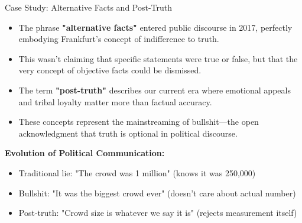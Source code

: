 \documentclass{beamer}
\begin{document}
	\begin{frame}{Case Study: Alternative Facts and Post-Truth}
		\begin{itemize}
			\item The phrase \textbf{"alternative facts"} entered public discourse in 2017, perfectly embodying Frankfurt's concept of indifference to truth.
			\item This wasn't claiming that specific statements were true or false, but that the very concept of objective facts could be dismissed.
			\item The term \textbf{"post-truth"} describes our current era where emotional appeals and tribal loyalty matter more than factual accuracy.
			\item These concepts represent the mainstreaming of bullshit—the open acknowledgment that truth is optional in political discourse.
		\end{itemize}
		
		\begin{example}
			\textbf{Evolution of Political Communication:}
			\begin{itemize}
				\item Traditional lie: "The crowd was 1 million" (knows it was 250,000)
				\item Bullshit: "It was the biggest crowd ever" (doesn't care about actual number)
				\item Post-truth: "Crowd size is whatever we say it is" (rejects measurement itself)
			\end{itemize}
		\end{example}
	\end{frame}
	
\end{document}
